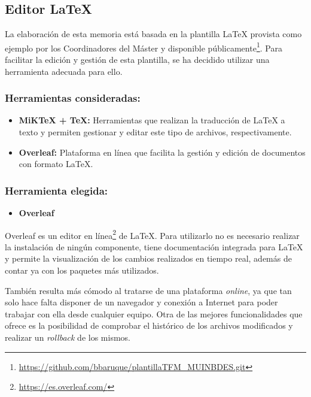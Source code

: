\subsection{Editor \LaTeX{}}

La elaboración de esta memoria está basada en la plantilla \LaTeX{} provista como ejemplo por los Coordinadores del Máster y disponible públicamente\footnote{\url{https://github.com/bbaruque/plantillaTFM_MUINBDES.git}}. Para facilitar la edición y gestión de esta plantilla, se ha decidido utilizar una herramienta adecuada para ello. 

\subsubsection{Herramientas consideradas:}

\begin{itemize}
    \item \textbf{MiK\TeX{} + \TeX{}:} Herramientas que realizan la traducción de \LaTeX{} a texto y permiten gestionar y editar este tipo de archivos, respectivamente.
    \item \textbf{Overleaf:} Plataforma en línea que facilita la gestión y edición de documentos con formato \LaTeX{}.
\end{itemize}

\subsubsection{Herramienta elegida:}

\begin{itemize}
    \item \textbf{Overleaf}
\end{itemize}

Overleaf es un editor en línea\footnote{\url{https://es.overleaf.com/}} de \LaTeX{}. Para utilizarlo no es necesario realizar la instalación de ningún componente, tiene documentación integrada para \LaTeX{} y permite la visualización de los cambios realizados en tiempo real, además de contar ya con los paquetes más utilizados.

También resulta más cómodo al tratarse de una plataforma \textit{online}, ya que tan solo hace falta disponer de un navegador y conexión a Internet para poder trabajar con ella desde cualquier equipo. Otra de las mejores funcionalidades que ofrece es la posibilidad de comprobar el histórico de los archivos modificados y realizar un \textit{rollback} de los mismos.

